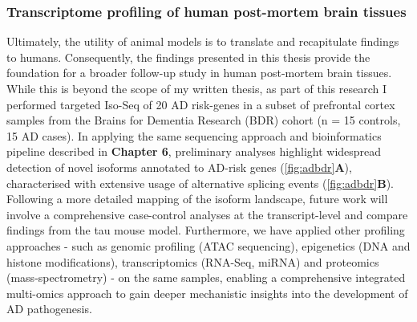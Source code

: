 {\subsubsection{Transcriptome profiling of human post-mortem brain tissues}  
Ultimately, the utility of animal models is to translate and recapitulate findings to humans. Consequently, the findings presented in this thesis provide the foundation for a broader follow-up study in human post-mortem brain tissues. While this is beyond the scope of my written thesis, as part of this research I performed targeted Iso-Seq of 20 AD risk-genes in a subset of prefrontal cortex samples from the Brains for Dementia Research (BDR) cohort (n = 15 controls, 15 AD cases). In applying the same sequencing approach and bioinformatics pipeline described in \textbf{Chapter 6}, preliminary analyses highlight widespread detection of novel isoforms annotated to AD-risk genes (\cref{fig:adbdr}\textbf{A}), characterised with extensive usage of alternative splicing events (\cref{fig:adbdr}\textbf{B}). Following a more detailed mapping of the isoform landscape, future work will involve a comprehensive case-control analyses at the transcript-level and compare findings from the tau mouse model. Furthermore, we have applied other profiling approaches - such as genomic profiling (ATAC sequencing), epigenetics (DNA and histone modifications), transcriptomics (RNA-Seq, miRNA) and proteomics (mass-spectrometry) - on the same samples, enabling a comprehensive integrated multi-omics approach to gain deeper mechanistic insights into the development of AD pathogenesis.     

}
